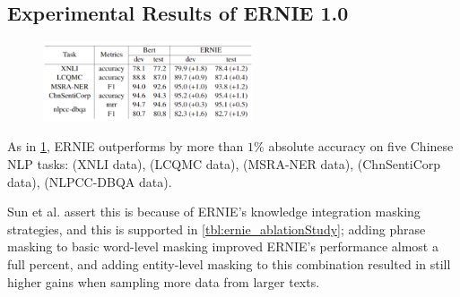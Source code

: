 \subsection{Experimental Results of ERNIE 1.0}\label{sec:ExperimentalResultsERNIE}





\begin{program}
\begin{figure}
\begin{center}
    \includegraphics[width=0.55\textwidth]{imgs/ernie_tableResults.png}
\end{center}
\vspace{-20pt}
\vspace{-5pt}
\label{tbl:ernie_vs_bert_Results}
\end{figure}

As in \cref{tbl:ernie_vs_bert_Results}, ERNIE outperforms  by more than $1 \%$ absolute accuracy on five Chinese NLP tasks:  (XNLI data),  (LCQMC data),  (MSRA-NER data),  (ChnSentiCorp data),  (NLPCC-DBQA data).

\end{program}



Sun et al. assert this is because of ERNIE's knowledge integration masking strategies, and this is supported in \cref{tbl:ernie_ablationStudy}; adding phrase masking to basic word-level masking improved ERNIE's performance almost a full percent, and adding entity-level masking to this combination resulted in still higher gains when sampling more data from larger texts. 


